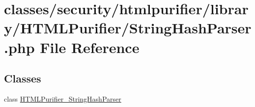 \hypertarget{StringHashParser_8php}{\section{classes/security/htmlpurifier/library/\+H\+T\+M\+L\+Purifier/\+String\+Hash\+Parser.php File Reference}
\label{StringHashParser_8php}
}
\subsection*{Classes}
\begin{DoxyCompactItemize}
\item 
class \hyperlink{classHTMLPurifier__StringHashParser}{H\+T\+M\+L\+Purifier\+\_\+\+String\+Hash\+Parser}
\end{DoxyCompactItemize}
